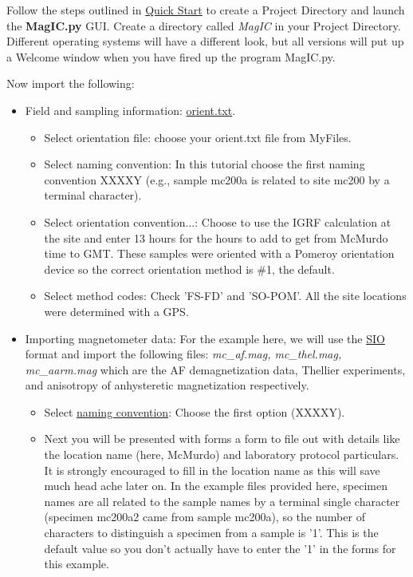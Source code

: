 \documentclass[11pt]{book}
\begin{document}
{{{Follow the steps outlined in \href{#quick_start}{Quick Start}  to create a Project Directory  and launch the {\bf MagIC.py} GUI.  Create a directory called {\it MagIC} in your Project Directory.  Different operating systems will have a different look, but all versions will put up a Welcome window when you have fired up the program MagIC.py. 

Now import the following:
\begin{itemize}
	\item  Field and sampling information: \href{#field\_info}{orient.txt}.
 	\begin{itemize}
		\item 	Select orientation file:  choose your orient.txt file from MyFiles.
		\item Select naming convention:   In this tutorial choose the first naming convention  XXXXY (e.g., sample mc200a is related to site mc200 by a terminal character).  
		\item Select orientation convention...:  Choose to use the IGRF calculation at the site and enter 13 hours for the hours to add to get from McMurdo time to GMT.  These samples were oriented with a Pomeroy orientation device so the correct orientation method is \#1, the default.
		\item  Select method codes: Check 'FS-FD' and 'SO-POM'.   All the site locations were determined with a GPS.   
	\end{itemize}
	\item {Importing magnetometer data:}
  For the example here, we will use the \href{#sio_magic.py}{SIO} format and  import the following files: {\it mc\_af.mag, mc\_thel.mag, mc\_aarm.mag} which are the AF demagnetization data, Thellier experiments, and anisotropy of  anhysteretic magnetization respectively.
	\begin{itemize}
		\item Select \href{#naming_schemes}{naming convention}:  Choose the first option (XXXXY).  	
		\item Next you will be presented with forms a form to file out with details like the location name (here, McMurdo) and laboratory protocol particulars. It is strongly encouraged to fill in the location name as this will save much head ache later on.   In the example files provided here,   specimen names are all related to the sample	names by a terminal single character (specimen mc200a2 came from sample mc200a), so the number of characters to distinguish a specimen from a sample is '1'.  This is the default value so you don't actually have to enter the '1' in the forms for this example.  

\end{itemize}
\end{itemize}}}}
\end{document}
